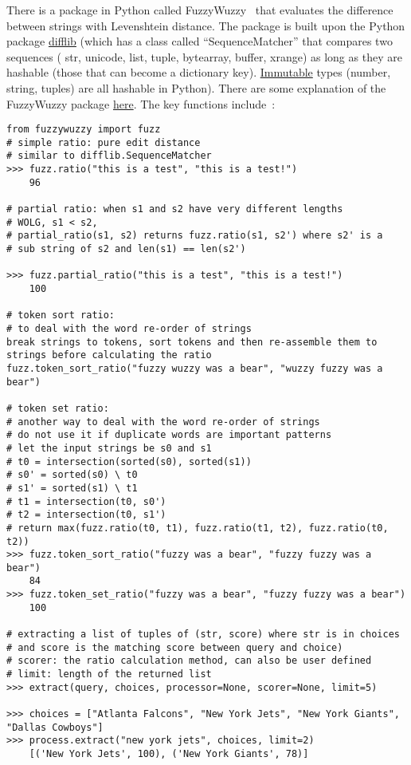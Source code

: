 \documentclass[12pt]{article}
\begin{document}
There is a package in Python called FuzzyWuzzy~\cite{fuzzyWuzzy2015}
that evaluates the difference between strings with Levenshtein
distance. The package is built upon the Python package
\href{https://docs.python.org/2/library/difflib.html}{difflib} (which
has a class called ``SequenceMatcher'' that compares two sequences (
str, unicode, list, tuple, bytearray, buffer, xrange) as long as they
are hashable (those that can become a dictionary
key). \href{https://docs.python.org/2/glossary.html#term-immutable}{Immutable}
types (number, string, tuples) are all hashable in Python). There are
some explanation of the FuzzyWuzzy package
\href{http://chairnerd.seatgeek.com/fuzzywuzzy-fuzzy-string-matching-in-python/}{here}. The
key functions include~\cite{fuzzyWuzzyGit2015}:
\makeatletter
\def\verbatim@font{\linespread{1}\small\ttfamily}
\begin{verbatim}
from fuzzywuzzy import fuzz
# simple ratio: pure edit distance
# similar to difflib.SequenceMatcher
>>> fuzz.ratio("this is a test", "this is a test!")
    96

# partial ratio: when s1 and s2 have very different lengths 
# WOLG, s1 < s2,
# partial_ratio(s1, s2) returns fuzz.ratio(s1, s2') where s2' is a
# sub string of s2 and len(s1) == len(s2')

>>> fuzz.partial_ratio("this is a test", "this is a test!")
    100

# token sort ratio: 
# to deal with the word re-order of strings
break strings to tokens, sort tokens and then re-assemble them to strings before calculating the ratio
fuzz.token_sort_ratio("fuzzy wuzzy was a bear", "wuzzy fuzzy was a bear")

# token set ratio: 
# another way to deal with the word re-order of strings
# do not use it if duplicate words are important patterns
# let the input strings be s0 and s1
# t0 = intersection(sorted(s0), sorted(s1))
# s0' = sorted(s0) \ t0
# s1' = sorted(s1) \ t1
# t1 = intersection(t0, s0')
# t2 = intersection(t0, s1')
# return max(fuzz.ratio(t0, t1), fuzz.ratio(t1, t2), fuzz.ratio(t0, t2))
>>> fuzz.token_sort_ratio("fuzzy was a bear", "fuzzy fuzzy was a bear")
    84
>>> fuzz.token_set_ratio("fuzzy was a bear", "fuzzy fuzzy was a bear")
    100

# extracting a list of tuples of (str, score) where str is in choices 
# and score is the matching score between query and choice)
# scorer: the ratio calculation method, can also be user defined
# limit: length of the returned list
>>> extract(query, choices, processor=None, scorer=None, limit=5)

>>> choices = ["Atlanta Falcons", "New York Jets", "New York Giants", "Dallas Cowboys"]
>>> process.extract("new york jets", choices, limit=2)
    [('New York Jets', 100), ('New York Giants', 78)]
\end{verbatim}
\end{document}
